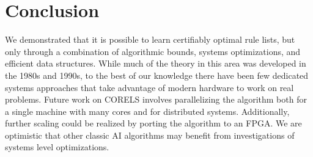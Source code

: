 \documentclass[format=sigconf]{acmart}
\begin{document}
\section{Conclusion}
We demonstrated that it is possible to learn certifiably optimal rule lists, but only through a combination of algorithmic bounds, systems optimizations, and efficient data structures.
While much of the theory in this area was developed in the 1980s and 1990s, to the best of our knowledge there have been few dedicated systems approaches that take advantage of modern hardware to work on real problems.
Future work on CORELS involves parallelizing the algorithm both for a single machine with many cores and for distributed systems.
Additionally, further scaling could be realized by porting the algorithm to an FPGA.
We are optimistic that other classic AI algorithms may benefit from investigations of systems level optimizations.


%

\end{document}
